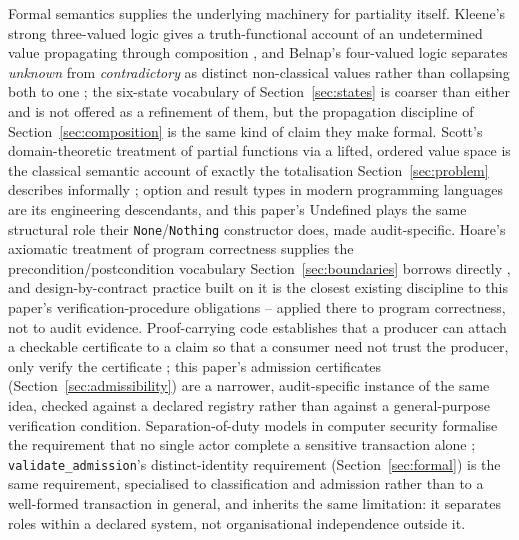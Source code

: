 \documentclass[smallcondensed,envcountsect,natbib]{svjour3}
\newcommand{\state}[1]{\textsf{#1}}
\begin{document}
Formal semantics supplies the underlying machinery for partiality itself. Kleene's strong three-valued logic gives a truth-functional account of an undetermined value propagating through composition \citep{kleene1952}, and Belnap's four-valued logic separates \emph{unknown} from \emph{contradictory} as distinct non-classical values rather than collapsing both to one \citep{belnap1977}; the six-state vocabulary of Section~\ref{sec:states} is coarser than either and is not offered as a refinement of them, but the propagation discipline of Section~\ref{sec:composition} is the same kind of claim they make formal. Scott's domain-theoretic treatment of partial functions via a lifted, ordered value space is the classical semantic account of exactly the totalisation Section~\ref{sec:problem} describes informally \citep{scott1970}; option and result types in modern programming languages are its engineering descendants, and this paper's \state{Undefined} plays the same structural role their \texttt{None}/\texttt{Nothing} constructor does, made audit-specific. Hoare's axiomatic treatment of program correctness supplies the precondition/postcondition vocabulary Section~\ref{sec:boundaries} borrows directly \citep{hoare1969}, and design-by-contract practice built on it is the closest existing discipline to this paper's verification-procedure obligations -- applied there to program correctness, not to audit evidence. Proof-carrying code establishes that a producer can attach a checkable certificate to a claim so that a consumer need not trust the producer, only verify the certificate \citep{necula1997}; this paper's admission certificates (Section~\ref{sec:admissibility}) are a narrower, audit-specific instance of the same idea, checked against a declared registry rather than against a general-purpose verification condition. Separation-of-duty models in computer security formalise the requirement that no single actor complete a sensitive transaction alone \citep{clarkwilson1987}; \texttt{validate\_admission}'s distinct-identity requirement (Section~\ref{sec:formal}) is the same requirement, specialised to classification and admission rather than to a well-formed transaction in general, and inherits the same limitation: it separates roles within a declared system, not organisational independence outside it.
\end{document}
